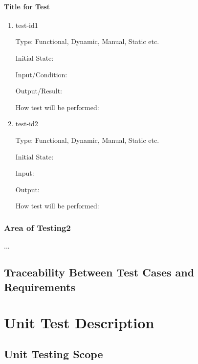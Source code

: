 \documentclass[12pt, titlepage]{article}
\begin{document}
	\paragraph{Title for Test}
	
	\begin{enumerate}
		
		\item{test-id1\\}
		
		Type: Functional, Dynamic, Manual, Static etc.
		
		Initial State: 
		
		Input/Condition: 
		
		Output/Result: 
		
		How test will be performed: 
		
		\item{test-id2\\}
		
		Type: Functional, Dynamic, Manual, Static etc.
		
		Initial State: 
		
		Input: 
		
		Output: 
		
		How test will be performed: 
		
	\end{enumerate}
	
	\subsubsection{Area of Testing2}
	
	...
	
	\subsection{Traceability Between Test Cases and Requirements}
	
	
	\section{Unit Test Description}
	
	
	\subsection{Unit Testing Scope}
	
\end{document}
